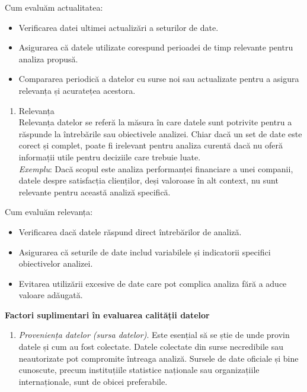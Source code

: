 \documentclass[
  11pt,
  b5paper,
  nottoc]{book}
\providecommand{\tightlist}{%
  \setlength{\itemsep}{0pt}\setlength{\parskip}{0pt}}\usepackage{longtable,booktabs,array}
\begin{document}
Cum evaluăm actualitatea:

\begin{itemize}
\tightlist
\item
  Verificarea datei ultimei actualizări a seturilor de date.\\
\item
  Asigurarea că datele utilizate corespund perioadei de timp relevante
  pentru analiza propusă.\\
\item
  Compararea periodică a datelor cu surse noi sau actualizate pentru a
  asigura relevanța și acuratețea acestora.
\end{itemize}

\begin{enumerate}
\def\labelenumi{\arabic{enumi}.}
\setcounter{enumi}{4}
\tightlist
\item
  Relevanța\\
  Relevanța datelor se referă la măsura în care datele sunt potrivite
  pentru a răspunde la întrebările sau obiectivele analizei. Chiar dacă
  un set de date este corect și complet, poate fi irelevant pentru
  analiza curentă dacă nu oferă informații utile pentru deciziile care
  trebuie luate.\\
  \emph{Exemplu}: Dacă scopul este analiza performanței financiare a
  unei companii, datele despre satisfacția clienților, deși valoroase în
  alt context, nu sunt relevante pentru această analiză specifică.
\end{enumerate}

Cum evaluăm relevanța:

\begin{itemize}
\tightlist
\item
  Verificarea dacă datele răspund direct întrebărilor de analiză.\\
\item
  Asigurarea că seturile de date includ variabilele și indicatorii
  specifici obiectivelor analizei.\\
\item
  Evitarea utilizării excesive de date care pot complica analiza fără a
  aduce valoare adăugată.
\end{itemize}

\textbf{Factori suplimentari în evaluarea calității datelor}

\begin{enumerate}
\def\labelenumi{\arabic{enumi}.}
\tightlist
\item
  \emph{Proveniența datelor (sursa datelor)}. Este esențial să se știe
  de unde provin datele și cum au fost colectate. Datele colectate din
  surse necredibile sau neautorizate pot compromite întreaga analiză.
  Sursele de date oficiale și bine cunoscute, precum instituțiile
  statistice naționale sau organizațiile internaționale, sunt de obicei
  preferabile.
\end{enumerate}
\end{document}
